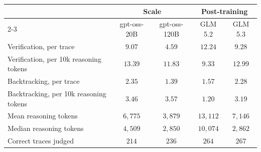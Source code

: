 \begin{tabular}{lcccc}
\toprule
 & \multicolumn{2}{c}{Scale} & \multicolumn{2}{c}{Post-training} \\
\cmidrule{2-3}\cmidrule{4-5}
 & gpt-oss-20B & gpt-oss-120B & GLM 5.2 & GLM 5.3 \\
\midrule
Verification, per trace & $9.07$ & $4.59$ & $12.24$ & $9.28$ \\
Verification, per 10k reasoning tokens & $13.39$ & $11.83$ & $9.33$ & $12.99$ \\
Backtracking, per trace & $2.35$ & $1.39$ & $1.57$ & $2.28$ \\
Backtracking, per 10k reasoning tokens & $3.46$ & $3.57$ & $1.20$ & $3.19$ \\
\addlinespace
Mean reasoning tokens & $6{,}775$ & $3{,}879$ & $13{,}112$ & $7{,}146$ \\
Median reasoning tokens & $4{,}509$ & $2{,}850$ & $10{,}074$ & $2{,}862$ \\
Correct traces judged & $214$ & $236$ & $264$ & $267$ \\
\bottomrule
\end{tabular}
